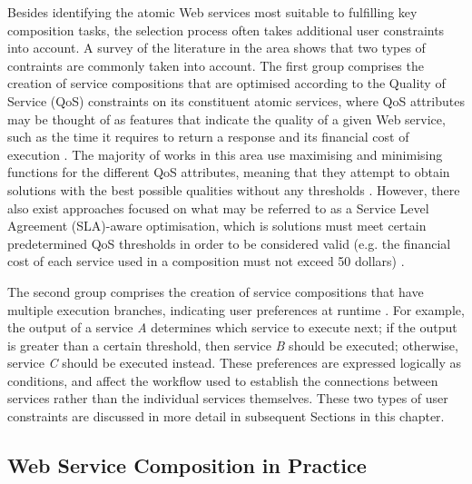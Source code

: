 Besides identifying the atomic Web services most suitable to fulfilling key composition tasks, the selection process often takes additional user constraints into account. A survey of the literature in the area shows that two types of contraints are commonly taken into account. The first group comprises the creation of service compositions that are optimised according to the Quality of Service (QoS) constraints on its constituent atomic services, where QoS attributes may be thought of as features that indicate the quality of a given Web service, such as the time it requires to return a response and its financial cost of execution \cite{da2014graph}. The majority of works in this area use maximising and minimising functions for the different QoS attributes, meaning that they attempt to obtain solutions with the best possible qualities without any thresholds \cite{wang2013improved,parejo2008qos,yoo2008web,garcia2008qos,zhang2010qos,wang2012survey,moghaddam2014service,kattepur2013qos,DBLP:journals/soca/LiZDSGL13}. However, there also exist approaches focused on what may be referred to as a Service Level Agreement (SLA)-aware optimisation, which is solutions must meet certain predetermined QoS thresholds in order to be considered valid (e.g. the financial cost of each service used in a composition must not exceed 50 dollars) \cite{yoo2008web,yin2014hybrid,chen2014partial,berg2013revenue}.

The second group comprises the creation of service compositions that have multiple execution branches, indicating user preferences at runtime \cite{wang2014automated,boustil2010web,karakoc2009composing,marconi2006specifying,bertoli2009control}. For example, the output of a service \textit{A} determines which service to execute next; if the output is greater than a certain threshold, then service \textit{B} should be executed; otherwise, service \textit{C} should be executed instead. These preferences are expressed logically as conditions, and affect the workflow used to establish the connections between services rather than the individual services themselves. These two types of user constraints are discussed in more detail in subsequent Sections in this chapter.

\subsection{Web Service Composition in Practice}

